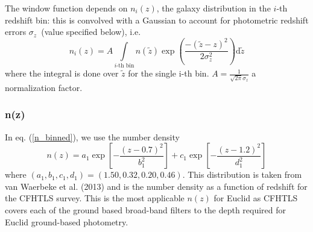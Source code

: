 The window function depends on $n_{i}(z)$, the galaxy distribution
in the $i$-th redshift bin: this is convolved with a Gaussian to account for photometric
redshift errors $\sigma_{z}$~(value specified below), i.e.~
\begin{equation}
n_{i}(z)=A \int\limits _{i\text{-th bin}}n({\tilde z})\exp\left(\frac{-(\tilde{z}-z)^{2}}{2 \sigma_{z}^{2}}\right)\mathrm{d}\tilde{z}
\label{n_binned}
\end{equation}
where the integral is done over $\tilde{z}$ for the single i-th bin. 
$A = \frac{1}{\sqrt{2\pi} \sigma_z}$ a normalization factor.

\subsubsection{n(z)}
In eq. (\ref{n_binned}), we use the number density
\begin{equation}
n(z) = a_1\exp\left[-\frac{(z-0.7)^2}{b_1^2}\right]+c_1\exp\left[-\frac{(z-1.2)^2}{d_1^2}\right]
\end{equation}
where $(a_1, b_1, c_1, d_1)=(1.50, 0.32, 0.20, 0.46)$. This distribution is taken from van Waerbeke et al. (2013) and 
is the number density as a function of redshift for the CFHTLS survey. This is the most applicable $n(z)$ for Euclid as 
CFHTLS covers each of the ground based broad-band filters to the depth required for Euclid ground-based photometry. 


